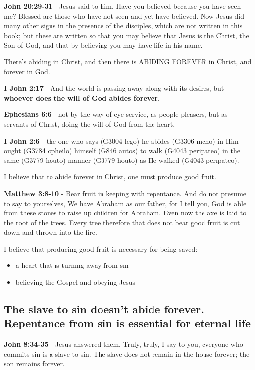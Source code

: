 \documentclass[11pt]{article}
\begin{document}
\textbf{John 20:29-31} - Jesus said to him, Have you believed because you have seen me? Blessed are those who have not seen and yet have believed.  Now Jesus did many other signs in the presence of the disciples, which are not written in this book; but these are written so that you may believe that Jesus is the Christ, the Son of God, and that by believing you may have life in his name.

There's abiding in Christ, and then there is ABIDING FOREVER in Christ, and forever in God.

\textbf{I John 2:17} - And the world is passing away along with its desires, but \textbf{whoever does the will of God abides forever}.

\textbf{Ephesians 6:6} - not by the way of eye-service, as people-pleasers, but as servants of Christ, doing the will of God from the heart,

\textbf{I John 2:6} - the one who says (G3004 lego) he abides (G3306 meno) in Him ought (G3784 opheilo) himself (G846 autos) to walk (G4043 peripateo) in the same (G3779 houto) manner (G3779 houto) as He walked (G4043 peripateo).

I believe that to abide forever in Christ, one must produce good fruit.

\textbf{Matthew 3:8-10} - Bear fruit in keeping with repentance.  And do not presume to say to yourselves, We have Abraham as our father, for I tell you, God is able from these stones to raise up children for Abraham.  Even now the axe is laid to the root of the trees. Every tree therefore that does not bear good fruit is cut down and thrown into the fire.

I believe that producing good fruit is necessary for being saved:
\begin{itemize}
\item a heart that is turning away from sin
\item believing the Gospel and obeying Jesus
\end{itemize}

\subsection{The slave to sin doesn't abide forever. Repentance from sin is essential for eternal life}
\label{sec:orgef89442}
\textbf{John 8:34-35} - Jesus answered them, Truly, truly, I say to you, everyone who commits sin is a slave to sin. The slave does not remain in the house forever; the son remains forever.
\end{document}
